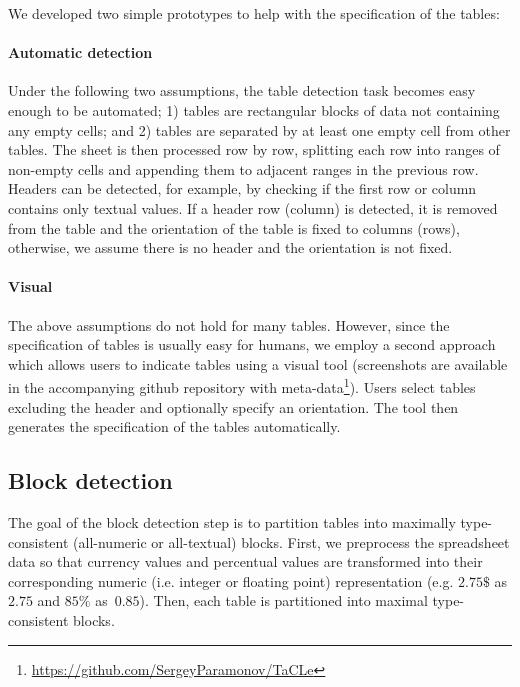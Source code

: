 We developed two simple prototypes to help with the specification of the tables:


\paragraph{Automatic detection}
Under the following two assumptions, the table detection task becomes easy enough to be automated; 1) tables are rectangular blocks of data not containing any empty cells; and 2) tables are separated by at least one empty cell from other tables.
The sheet is then processed row by row, splitting each row into ranges of non-empty cells and appending them to adjacent ranges in the previous row.
Headers can be detected, for example, by checking if the first row or column contains only textual values. If a header row (column) is detected, it is removed from the table and the orientation of the table is fixed to columns (rows), otherwise, we assume there is no header and the orientation is not fixed.

\paragraph{Visual}
The above assumptions do not hold for many tables. However, since the specification of tables is usually easy for humans, we employ a second approach which allows users to indicate tables using a visual tool (screenshots are available in the accompanying github repository with meta-data\footnote{\url{https://github.com/SergeyParamonov/TaCLe}\label{github-link}}).
Users select tables excluding the header and optionally specify an orientation.
The tool then generates the specification of the tables automatically.





\subsection{Block detection} \label{sec:make_groups}
The goal of the block detection step is to partition tables into maximally type-consistent (all-numeric or all-textual) blocks.
First, we preprocess the spreadsheet data so that currency values and percentual values are transformed into their corresponding numeric (i.e. integer or floating point) representation (e.g. $2.75 \$$ as $2.75$ and $85\%$ as~$0.85$).
Then, each table is partitioned into maximal type-consistent blocks.

